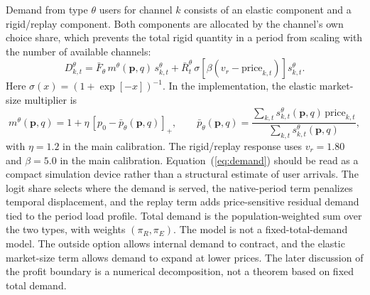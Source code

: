 \documentclass[11pt,a4paper]{article}
\newcommand{\D}{D}
\newcommand{\p}{\boldsymbol{p}}
\begin{document}
Demand from type $\theta$ users for channel $k$ consists of an elastic component and a rigid/replay component. Both components are allocated by the channel's own choice share, which prevents the total rigid quantity in a period from scaling with the number of available channels:
\begin{equation}
  \D^\theta_{k,t}=\bar F_\theta\,m^\theta(\p,q)\,s^\theta_{k,t}
  +\bar R^\theta_t\,\sigma[\beta(v_r-\text{price}_{k,t})]s^\theta_{k,t}.
  \label{eq:demand}
\end{equation}
Here $\sigma(x)=(1+\exp[-x])^{-1}$. In the implementation, the elastic market-size multiplier is
\begin{equation}
  m^\theta(\p,q)
  =
  1+\eta\,[p_0-\bar p_\theta(\p,q)]_+,
  \qquad
  \bar p_\theta(\p,q)
  =
  \frac{\sum_{k,t}s^\theta_{k,t}(\p,q)\,\text{price}_{k,t}}
       {\sum_{k,t}s^\theta_{k,t}(\p,q)} ,
  \label{eq:market_size}
\end{equation}
with $\eta=1.2$ in the main calibration. The rigid/replay response uses $v_r=1.80$ and $\beta=5.0$ in the main calibration. Equation~(\ref{eq:demand}) should be read as a compact simulation device rather than a structural estimate of user arrivals. The logit share selects where the demand is served, the native-period term penalizes temporal displacement, and the replay term adds price-sensitive residual demand tied to the period load profile. Total demand is the population-weighted sum over the two types, with weights $(\pi_R,\pi_E)$. The model is not a fixed-total-demand model. The outside option allows internal demand to contract, and the elastic market-size term allows demand to expand at lower prices. The later discussion of the profit boundary is a numerical decomposition, not a theorem based on fixed total demand.
\end{document}
